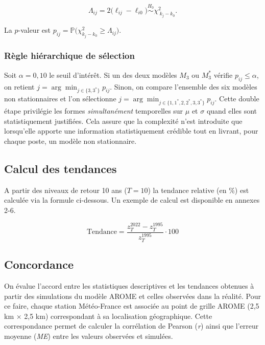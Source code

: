 \documentclass[
  article,
  nofooter,
  noheadings]{jss}
\begin{document}
\[
\Lambda_{ij}=2\bigl(\ell_{ij}-\ell_{i0}\bigr)
\overset{H_0}{\sim}\chi^{2}_{\;k_j-k_0}.
\]

La \(p\)-valeur est
\(p_{ij}= \mathbb{P}(\chi^{2}_{k_j-k_0}\ge \Lambda_{ij}\bigr)\).

\subsubsection{Règle hiérarchique de
sélection}\label{ruxe8gle-hiuxe9rarchique-de-suxe9lection}

Soit \(\alpha=0{,}10\) le seuil d'intérêt. Si un des deux modèles
\(M_3\) ou \(M_3^\ast\) vérifie \(p_{ij}\le\alpha\), on retient
\(j=\arg\min_{j\in\{3,3^\ast\}} p_{ij}\). Sinon, on compare l'ensemble
des six modèles non stationnaires et l'on sélectionne
\(j=\arg\min_{j\in\{1,1^\ast,2,2^\ast,3,3^\ast\}} p_{ij}\). Cette double
étape privilégie les formes \emph{simultanément} temporelles sur \(\mu\)
et \(\sigma\) quand elles sont statistiquement justifiées. Cela assure
que la complexité n'est introduite que lorsqu'elle apporte une
information statistiquement crédible tout en livrant, pour chaque poste,
un modèle non stationnaire.

\subsection{Calcul des tendances}\label{calcul-des-tendances}

A partir des niveaux de retour 10 ans (\(T = 10\)) la tendance relative
(en \%) est calculée via la formule ci-dessous. Un exemple de calcul est
disponible en annexes 2-6.

\begin{tcolorbox}[enhanced jigsaw, arc=.35mm, left=2mm, rightrule=.15mm, breakable, colframe=quarto-callout-color-frame, colback=white, bottomrule=.15mm, opacityback=0, leftrule=.75mm, toprule=.15mm]

\[
\text{Tendance} = \frac{z_T^{2022} - z_T^{1995}}{z_T^{1995}} \cdot {100}
\]

\end{tcolorbox}

\subsection{Concordance}\label{concordance}

On évalue l'accord entre les statistiques descriptives et les tendances
obtenues à partir des simulations du modèle AROME et celles observées
dans la réalité. Pour ce faire, chaque station Météo-France est associée
au point de grille AROME (2,5 km × 2,5 km) correspondant à sa
localisation géographique. Cette correspondance permet de calculer la
corrélation de Pearson (\emph{r}) ainsi que l'erreur moyenne (\emph{ME})
entre les valeurs observées et simulées.
\end{document}

